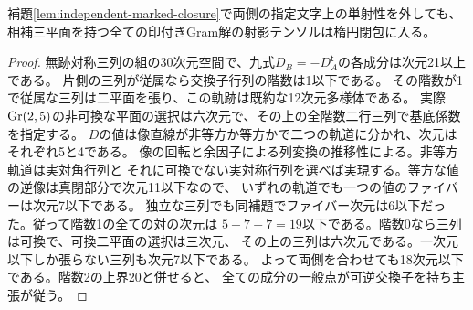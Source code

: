 \begin{lemma}[全ての相補三平面を持つ印]\label{lem:all-split-marked-closure}
補題\ref{lem:independent-marked-closure}で両側の指定文字上の単射性を外しても、
相補三平面を持つ全ての印付きGram解の射影テンソルは楕円閉包に入る。
\end{lemma}
\begin{proof}
無跡対称三列の組の30次元空間で、九式$D_B=-D_A^{\mathsf t}$の各成分は次元21以上である。
片側の三列が従属なら交換子行列の階数は1以下である。
その階数が1で従属な三列は二平面を張り、この軌跡は既約な12次元多様体である。
実際$\operatorname{Gr}(2,5)$の非可換な平面の選択は六次元で、その上の全階数二行三列で基底係数を指定する。
$D$の値は像直線が非等方か等方かで二つの軌道に分かれ、次元はそれぞれ5と4である。
像の回転と余因子による列変換の推移性による。非等方軌道は実対角行列と
それに可換でない実対称行列を選べば実現する。等方な値の逆像は真閉部分で次元11以下なので、
いずれの軌道でも一つの値のファイバーは次元7以下である。
独立な三列でも同補題でファイバー次元は6以下だった。従って階数1の全ての対の次元は
$5+7+7=19$以下である。階数0なら三列は可換で、可換二平面の選択は三次元、
その上の三列は六次元である。一次元以下しか張らない三列も次元7以下である。
よって両側を合わせても18次元以下である。階数2の上界20と併せると、
全ての成分の一般点が可逆交換子を持ち主張が従う。
\end{proof}

